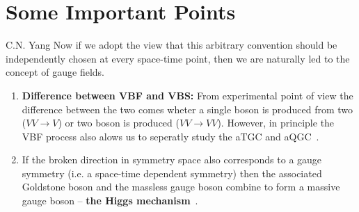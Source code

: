 \chapter{Some Important Points} %
\label{cha:some_important_points}
\begin{chapquote}
{C.N. Yang}
Now if we adopt the view that this arbitrary convention should be independently chosen at every space-time point, then we are naturally led to the concept of gauge fields.
\end{chapquote}

\begin{enumerate}
	\item \textbf{Difference between VBF and VBS:} From experimental point of view the difference between the two comes wheter a single boson is produced from two ($VV\rightarrow V$) or two boson is produced ($VV \rightarrow VV$). However, in principle the VBF process also alows us to seperatly study the aTGC and aQGC~\cite{Green2017}.
	\item If the broken direction in symmetry space also corresponds to a gauge symmetry (i.e. a space-time dependent symmetry) then the associated Goldstone boson and the massless gauge boson combine to form a massive gauge boson -- \textbf{the Higgs mechanism}~\cite{Chanowitz1988}.
\end{enumerate}

